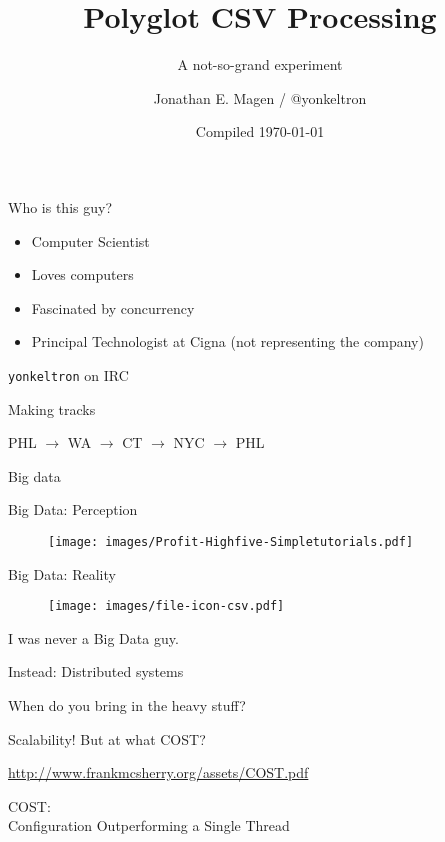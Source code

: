 \documentclass[aspectratio=169,14pt]{beamer}
\title{Polyglot CSV Processing}
\subtitle{A not-so-grand experiment}
\author{Jonathan E. Magen / \faicon{twitter} @yonkeltron}
\date{Compiled \today}
\newcommand{\megatext}[1]{
  \begin{center}
    \Huge
    #1
  \end{center}
}
\newcommand{\bigtext}[1]{
  \begin{center}
    \Large
    #1
  \end{center}
}
\begin{document}
\frame{\titlepage}

\begin{frame}{Who is this guy?}
  \begin{itemize}
  \item Computer Scientist
  \item Loves computers
  \item Fascinated by concurrency
  \item Principal Technologist at Cigna (not representing the company)
  \end{itemize}
\end{frame}

\begin{frame}
  \megatext{\texttt{yonkeltron} on IRC}
\end{frame}

\begin{frame}{Making tracks}
  \bigtext{PHL $\rightarrow$ WA $\rightarrow$ CT $\rightarrow$ NYC $\rightarrow$ PHL}
\end{frame}

\begin{frame}
  \megatext{Big data}
\end{frame}

\begin{frame}{Big Data: Perception}
  \begin{figure}
    \texttt{[image: images/Profit-Highfive-Simpletutorials.pdf]}
  \end{figure}
\end{frame}

\begin{frame}{Big Data: Reality}
  \begin{figure}
    \texttt{[image: images/file-icon-csv.pdf]}
  \end{figure}
\end{frame}

\begin{frame}
  \megatext{I was never a Big Data guy.}
  \bigtext{Instead: Distributed systems}
\end{frame}

\begin{frame}
  \megatext{When do you bring in the heavy stuff?}
\end{frame}

\begin{frame}
  \bigtext{Scalability! But at what COST?}
  \begin{center}
    \url{http://www.frankmcsherry.org/assets/COST.pdf}
  \end{center}

  \bigtext{COST:\\Configuration Outperforming a Single Thread}
\end{frame}
\end{document}
